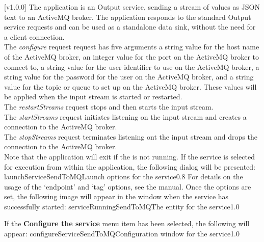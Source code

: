 [v1.0.0]
The  application is an Output service, sending a stream
of \yarp{} values as JSON text to an ActiveMQ broker.
The application responds to the standard Output service requests and can be used as a
standalone data sink, without the need for a client connection.\\

The \emph{configure} request request has five arguments \longDash{} a string value for the
host name of the ActiveMQ broker, an integer value for the port on the ActiveMQ broker to
connect to, a string value for the user identifier to use on the ActiveMQ broker, a string
value for the password for the user on the ActiveMQ broker, and a string value for the
topic or queue to set up on the ActiveMQ broker.
These values will be applied when the input stream is started or restarted.\\

The \emph{restartStreams} request stops and then starts the input stream.\\

The \emph{startStreams} request initiates listening on the input stream and creates a
connection to the ActiveMQ broker.\\

The \emph{stopStreams} request terminates listening ont the input stream and drops the
connection to the ActiveMQ broker.\\ 

Note that the application will exit if the \emph{\RS} is not running.
\insertAppParameters
\insertTagDescription{\SMO}
\insertInputServiceComment
\condPage
\insertStandardServiceCommands
\secondaryEnd
{}
If the service is selected for execution from within the \emph{\MMMU} application, the
following dialog will be presented:
%
{launchServiceSendToMQ}{Launch options for the \emph{\SMO} service}{0.8}
\condPage{}
For details on the usage of the `endpoint' and `tag' options, see the \emph{\MMMU} manual.
Once the options are set, the following image will appear in the \emph{\MMMU} window when
the service has successfully started:
%
{serviceRunningSendToMQ}{The \emph{\MMMU} entity for the \emph{\SMO} service}{1.0}

If the \textbf{Configure the service} menu item has been selected, the following will
appear:
%
{configureServiceSendToMQ}{Configuration window for the \emph{\SMO} service}{1.0}
\secondaryEnd
\primaryEnd{}
